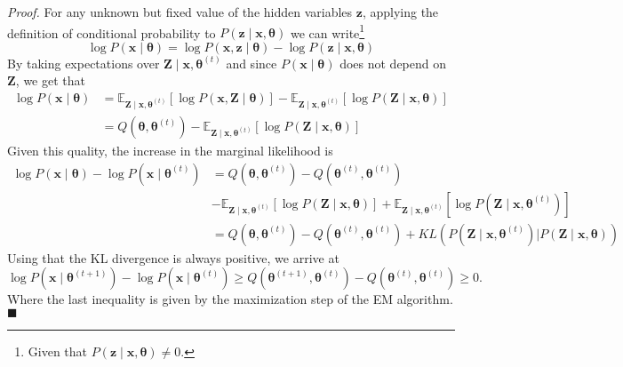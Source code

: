 \emph{Proof. } For any unknown but fixed value of the hidden variables \( \mathbf{z} \), applying the definition of conditional probability to \( P(\mathbf{z} \mid \mathbf{x}, \mathbf{\theta})\) we can write\footnote{Given that \( P(\mathbf{z} \mid \mathbf{x}, \mathbf{\theta}) \neq 0\).  }
\[
    \log P(\mathbf{x} \mid \mathbf{\theta}) = \log P(\mathbf{x}, \mathbf{z} \mid \mathbf{\theta}) - \log P(\mathbf{z} \mid \mathbf{x}, \mathbf{\theta})
\]
By taking expectations over \( \mathbf{Z} \mid \mathbf{x}, \mathbf{\theta}^{(t)} \) and since \(P(\mathbf{x}\mid \mathbf{\theta})\) does not depend on \(\mathbf{Z}\), we get that
\[
    \begin{aligned}
        \log P(\mathbf{x} \mid \mathbf{\theta}) & = \mathbb{E}_{\mathbf{Z} \mid \mathbf{x}, \mathbf{\theta}^{(t)}} \left[ \log P(\mathbf{x}, \mathbf{Z} \mid \mathbf{\theta}) \right] - \mathbb{E}_{\mathbf{Z} \mid \mathbf{x}, \mathbf{\theta}^{(t)}} \left[ \log P(\mathbf{Z} \mid \mathbf{x}, \mathbf{\theta}) \right] \\
                                                & = Q(\mathbf{\theta}, \mathbf{\theta}^{(t)}) - \mathbb{E}_{\mathbf{Z} \mid \mathbf{x}, \mathbf{\theta}^{(t)}} \left[ \log P(\mathbf{Z} \mid \mathbf{x}, \mathbf{\theta}) \right]
    \end{aligned}
\]
Given this quality, the increase in the marginal likelihood is
\[
    \begin{aligned}
        \log P(\mathbf{x} \mid \mathbf{\theta}) - \log P(\mathbf{x} \mid \mathbf{\theta}^{(t)}) & =
        Q(\mathbf{\theta}, \mathbf{\theta}^{(t)}) -  Q(\mathbf{\theta}^{(t)}, \mathbf{\theta}^{(t)})                                                                                                                                                                                                                                                                           \\
                                                                                                & - \mathbb{E}_{\mathbf{Z} \mid \mathbf{x}, \mathbf{\theta}^{(t)}} \left[ \log P(\mathbf{Z} \mid \mathbf{x}, \mathbf{\theta})\right] + \mathbb{E}_{\mathbf{Z} \mid \mathbf{x}, \mathbf{\theta}^{(t)}} \left[ \log P(\mathbf{Z} \mid \mathbf{x}, \mathbf{\theta}^{(t)}) \right] \\
                                                                                                & =  Q(\mathbf{\theta}, \mathbf{\theta}^{(t)}) -  Q(\mathbf{\theta}^{(t)}, \mathbf{\theta}^{(t)}) + KL\left(  P(\mathbf{Z} \mid \mathbf{x}, \mathbf{\theta}^{(t)}) \bigl\vert  P(\mathbf{Z} \mid \mathbf{x}, \mathbf{\theta})\right)
    \end{aligned}
\]
Using that the KL divergence is always positive, we arrive at
\[
    \log P(\mathbf{x} \mid \mathbf{\theta}^{(t+1)}) - \log P(\mathbf{x} \mid \mathbf{\theta}^{(t)}) \geq  Q(\mathbf{\theta}^{(t+1)}, \mathbf{\theta}^{(t)}) -  Q(\mathbf{\theta}^{(t)}, \mathbf{\theta}^{(t)}) \geq 0.
\]
Where the last inequality is given by the maximization step of the EM algorithm.\hfill \( \blacksquare \)

